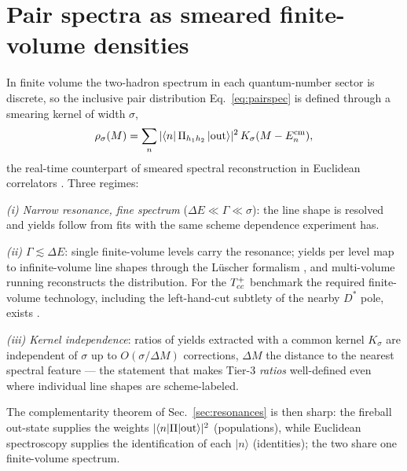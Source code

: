 \section{Pair spectra as smeared finite-volume densities}
\label{app:pair-spectra}

In finite volume the two-hadron spectrum in each quantum-number sector
is discrete, so the inclusive pair distribution
Eq.~\eqref{eq:pairspec} is defined through a smearing kernel of width
$\sigma$,
\begin{equation}
\rho_\sigma(M) = \sum_n |\langle n|\,\Pi_{h_1h_2}\,|{\rm out}\rangle|^2\,
K_\sigma(M-E_n^{\rm cm}),
\end{equation}
the real-time counterpart of smeared spectral reconstruction in
Euclidean correlators \cite{Hansen:2019idp}.  Three regimes:

\emph{(i) Narrow resonance, fine spectrum} ($\Delta E \ll \Gamma \ll
\sigma$): the line shape is resolved and yields follow from fits with
the same scheme dependence experiment has.

\emph{(ii) $\Gamma \lesssim \Delta E$}: single finite-volume levels
carry the resonance; yields per level map to infinite-volume line
shapes through the L\"uscher formalism
\cite{Luscher:1990ux,Briceno:2017max}, and multi-volume running
reconstructs the distribution.  For the $T_{cc}^{+}$ benchmark the required
finite-volume technology, including the left-hand-cut subtlety of the
nearby $D^*$ pole, exists
\cite{Padmanath:2022cvl,Raposo:2023oru}.

\emph{(iii) Kernel independence}: ratios of yields extracted with a
common kernel $K_\sigma$ are independent of $\sigma$ up to
$O(\sigma/\Delta M)$ corrections, $\Delta M$ the distance to the nearest
spectral feature --- the statement that makes Tier-3 \emph{ratios}
well-defined even where individual line shapes are scheme-labeled.

The complementarity theorem of Sec.~\ref{sec:resonances} is then
sharp: the fireball out-state supplies the weights
$|\langle n|\Pi|{\rm out}\rangle|^2$ (populations), while Euclidean
spectroscopy supplies the identification of each $|n\rangle$
(identities); the two share one finite-volume spectrum.
